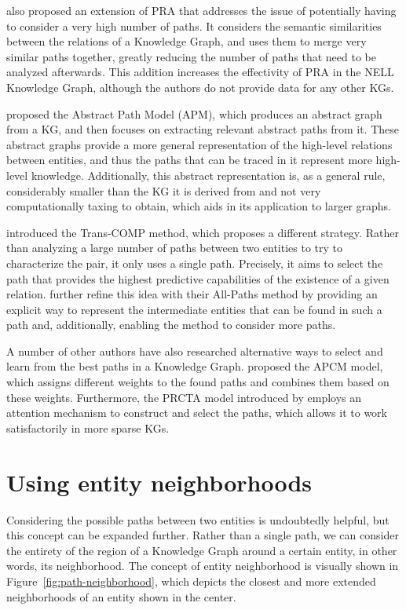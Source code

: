 \citet{gardner2013} also proposed an extension of PRA that addresses the issue of potentially having to consider a very high number of paths. It considers the semantic similarities between the relations of a Knowledge Graph, and uses them to merge very similar paths together, greatly reducing the number of paths that need to be analyzed afterwards. This addition increases the effectivity of PRA in the NELL Knowledge Graph, although the authors do not provide data for any other KGs.

\citet{nastase2019} proposed the Abstract Path Model (APM), which produces an abstract graph from a KG, and then focuses on extracting relevant abstract paths from it. These abstract graphs provide a more general representation of the high-level relations between entities, and thus the paths that can be traced in it represent more high-level knowledge. Additionally, this abstract representation is, as a general rule, considerably smaller than the KG it is derived from and not very computationally taxing to obtain, which aids in its application to larger graphs.

\citet{gu2015} introduced the Trans-COMP method, which proposes a different strategy. Rather than analyzing a large number of paths between two entities to try to characterize the pair, it only uses a single path. Precisely, it aims to select the path that provides the highest predictive capabilities of the existence of a given relation. \citet{toutanova2016} further refine this idea with their All-Paths method by providing an explicit way to represent the intermediate entities that can be found in such a path and, additionally, enabling the method to consider more paths.

A number of other authors have also researched alternative ways to select and learn from the best paths in a Knowledge Graph. \citet{jiang2017} proposed the APCM model, which assigns different weights to the found paths and combines them based on these weights. Furthermore, the PRCTA model introduced by \citet{lei2019} employs an attention mechanism \cite{vaswani2017} to construct and select the paths, which allows it to work satisfactorily in more sparse KGs.

\section{Using entity neighborhoods}\label{sec:path-neighborhood}
Considering the possible paths between two entities is undoubtedly helpful, but this concept can be expanded further. Rather than a single path, we can consider the entirety of the region of a Knowledge Graph around a certain entity, in other words, its neighborhood. The concept of entity neighborhood is visually shown in Figure~\ref{fig:path-neighborhood}, which depicts the closest and more extended neighborhoods of an entity shown in the center.

